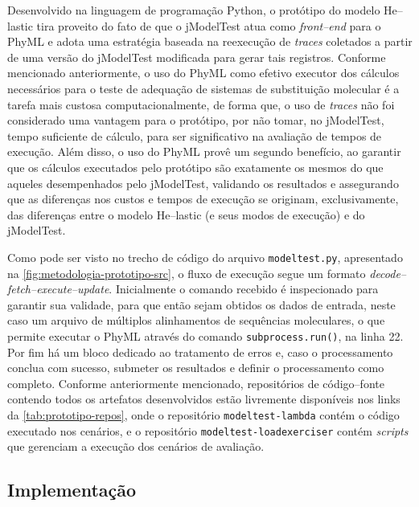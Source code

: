 \documentclass[english,brazilian]{UNISINOSmonografia} %
\begin{document}
Desenvolvido na linguagem de programação Python, o protótipo do modelo \textsf{He}--lastic tira proveito do fato de que o jModelTest atua como \textit{front--end} para o PhyML e adota uma estratégia baseada na reexecução de \textit{traces} coletados a partir de uma versão do jModelTest modificada para gerar tais registros.
%
Conforme mencionado anteriormente, o uso do PhyML como efetivo executor dos cálculos necessários para o teste de adequação de sistemas de substituição molecular é a tarefa mais custosa computacionalmente, de forma que, o uso de \textit{traces} não foi considerado uma vantagem para o protótipo, por não tomar, no jModelTest, tempo suficiente de cálculo, para ser significativo na avaliação de tempos de execução.
%
Além disso, o uso do PhyML provê um segundo benefício, ao garantir que os cálculos executados pelo protótipo são exatamente os mesmos do que aqueles desempenhados pelo jModelTest, validando os resultados e assegurando que as diferenças nos custos e tempos de execução se originam, exclusivamente, das diferenças entre o modelo \textsf{He}--lastic (e seus modos de execução) e do jModelTest.


Como pode ser visto no trecho de código do arquivo \texttt{modeltest.py}, apresentado na \autoref{fig:metodologia-prototipo-src}, o fluxo de execução segue um formato  \textit{decode--fetch--execute--update}.
%
Inicialmente o comando recebido é inspecionado para garantir sua validade, para que então sejam obtidos os dados de entrada, neste caso um arquivo de múltiplos alinhamentos de sequências moleculares, o que permite executar o PhyML através do comando \texttt{subprocess.run()}, na linha 22.
%
Por fim há um bloco dedicado ao tratamento de erros e, caso o processamento conclua com sucesso, submeter os resultados e definir o processamento como completo.
%
Conforme anteriormente mencionado, repositórios de código--fonte contendo todos os artefatos desenvolvidos estão livremente disponíveis nos links da \autoref{tab:prototipo-repos}, onde o repositório \texttt{modeltest-lambda} contém o código executado nos cenários, e o repositório \texttt{modeltest-loadexerciser} contém \textit{scripts} que gerenciam a execução dos cenários de avaliação.



\subsection{Implementação}
\end{document}
